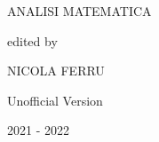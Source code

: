 \begin{titlepage}
\begin{center}
		\Huge \doublespacing \bfseries \begin{spacing}{1}{ANALISI MATEMATICA}\end{spacing}
		\hfill
		\normalsize \itshape \begin{spacing}{1}{}\end{spacing}
		\hfill
		\normalsize\itshape \begin{spacing}{1}{edited by}\end{spacing}
		\hfill
		\Large\itshape  \begin{spacing}{1}{NICOLA FERRU}\end{spacing}
		\vspace{0.5cm}
		
		\hfill
		\vfill
		\Large \bfseries \begin{spacing}{1}{Unofficial Version}\end{spacing}
		\vspace{0.5cm}
		{\small 2021 -  2022}
	\end{center}
	\clearpage
	\thispagestyle{empty}
	\vspace*{\fill}%
	{\par}%
	\vspace{\fill}
\end{titlepage}